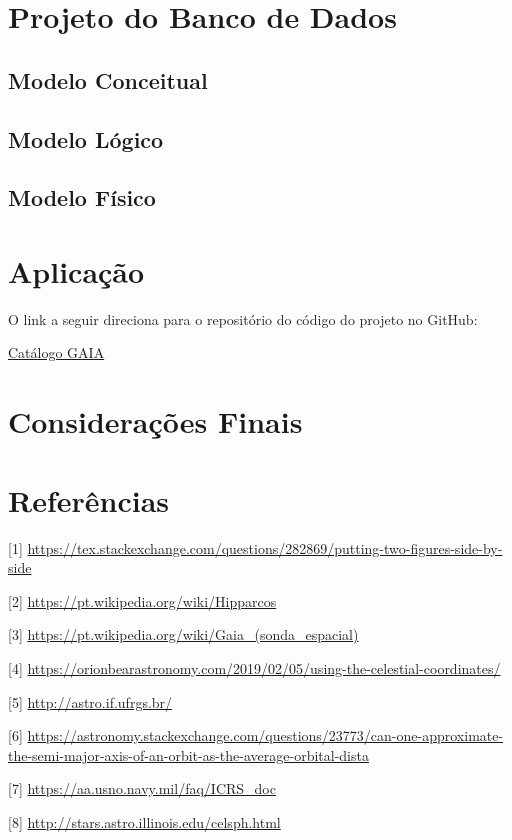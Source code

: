 \documentclass[12pt, a4paper]{article}
\begin{document}
	\section{Projeto do Banco de Dados}
	
	\subsection{Modelo Conceitual}
	\subsection{Modelo Lógico}
	\subsection{Modelo Físico}
	
	\section{Aplicação}
	
	O link a seguir direciona para o repositório do código do projeto no GitHub:
	
	\href{https://github.com/Laura-Costa/Catalogo_GAIA}{Catálogo GAIA} 
	\section{Considerações Finais}
	
	\newpage
	\section*{Referências}
	
	\vspace{20pt}
	
	[1] \url{https://tex.stackexchange.com/questions/282869/putting-two-figures-side-by-side}
	
	[2]
	\url{https://pt.wikipedia.org/wiki/Hipparcos}

	[3]
	\url{https://pt.wikipedia.org/wiki/Gaia_(sonda_espacial)}
	
	[4]
	\url{https://orionbearastronomy.com/2019/02/05/using-the-celestial-coordinates/}
	
	[5]
	\url{http://astro.if.ufrgs.br/}
	
	[6]
	\url{https://astronomy.stackexchange.com/questions/23773/can-one-approximate-the-semi-major-axis-of-an-orbit-as-the-average-orbital-dista}
	
	[7]
	\url{https://aa.usno.navy.mil/faq/ICRS_doc}
	
	[8]
	\url{http://stars.astro.illinois.edu/celsph.html}
	
	
	
\end{document}
